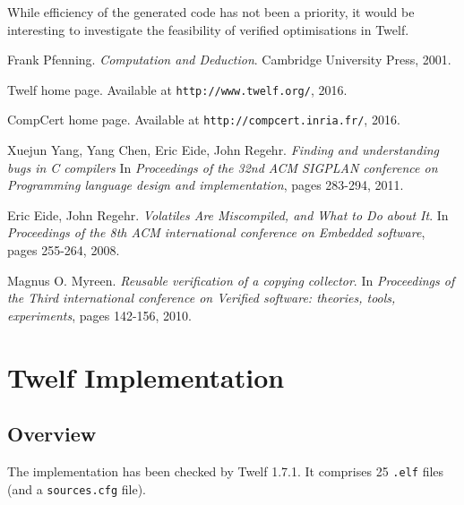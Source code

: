While efficiency of the generated code has not been a priority, it would be interesting to investigate the feasibility of verified optimisations in Twelf.

\clearpage

\begin{thebibliography}{9}

Frank Pfenning.
\textit{Computation and Deduction}.
Cambridge University Press, 2001.

Twelf home page. Available at \texttt{http://www.twelf.org/}, 2016.

CompCert home page. Available at \texttt{http://compcert.inria.fr/}, 2016.

Xuejun Yang, Yang Chen, Eric Eide, John Regehr.
\textit{Finding and understanding bugs in C compilers}
In \textit{Proceedings of the 32nd ACM SIGPLAN conference on Programming language design and implementation}, pages 283-294, 2011.

Eric Eide, John Regehr.
\textit{Volatiles Are Miscompiled, and What to Do about It}.
In \textit{Proceedings of the 8th ACM international conference on Embedded software}, pages 255-264, 2008.

Magnus O. Myreen.
\textit{Reusable verification of a copying collector}.
In \textit{Proceedings of the Third international conference on Verified software: theories, tools, experiments}, pages 142-156, 2010.

\end{thebibliography}


\appendix

\section{Twelf Implementation}
\label{sec:code}

\subsection{Overview}

The implementation has been checked by Twelf 1.7.1.
It comprises 25 \texttt{.elf} files (and a \texttt{sources.cfg} file).

